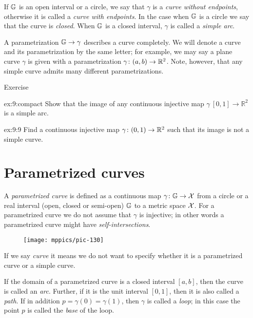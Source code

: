 If $\mathbb{G}$ is an open interval or a circle, we say that $\gamma$ is a \emph{curve without endpoints}, otherwise it is 
called a {}\emph{curve with endpoints}.
In the case when $\mathbb{G}$ is a circle we say that the curve is \emph{closed}. 
When $\mathbb{G}$ is a closed interval, $\gamma$ is called a \emph{simple arc}.


A parametrization $\mathbb{G}\to\gamma$ describes a curve completely.
We will denote a curve and its parametrization by the same letter;
for example, we may say a plane curve $\gamma$ is given with a parametrization $\gamma\:(a,b)\z\to \RR^2$.
Note, however, that any simple curve admits many different parametrizations. 

\begin{thm}{Exercise}\label{ex:9}

\begin{subthm}{ex:9:compact}
Show that the image of any continuous injective map $\gamma\:[0,1]\to\mathbb{R}^2$ is a simple arc.
\end{subthm}

\begin{subthm}{ex:9:9}
Find a continuous injective map $\gamma\colon(0,1)\to\mathbb{R}^2$ such that its image is not a simple curve.
\end{subthm}

\end{thm}


\section{Parametrized curves}

A \emph{parametrized curve} is defined as a continuous map $\gamma\colon\mathbb{G}\to\mathcal{X}$ from a circle or a real interval (open, closed or semi-open) $\mathbb{G}$ to a metric space $\mathcal{X}$. 
For a parametrized curve we do not assume that $\gamma$ is injective; in other words a parametrized curve might have \emph{self-intersections}.

\begin{wrapfigure}{o}{15 mm}
\vskip-3mm
\centering
\texttt{[image: mppics/pic-130]}
\end{wrapfigure}

If we say \emph{curve} it means we do not want to specify whether it is a parametrized curve or a simple curve.

If the domain of a parametrized curve is a closed interval $[a,b]$, then the curve is called an \emph{arc}.
Further, if it is the unit interval $[0,1]$, then it is also called a \emph{path}.
If in addition $p=\gamma(0)=\gamma(1)$, then $\gamma$ is called a \emph{loop};
in this case the point $p$ is called the \emph{base} of the loop.

